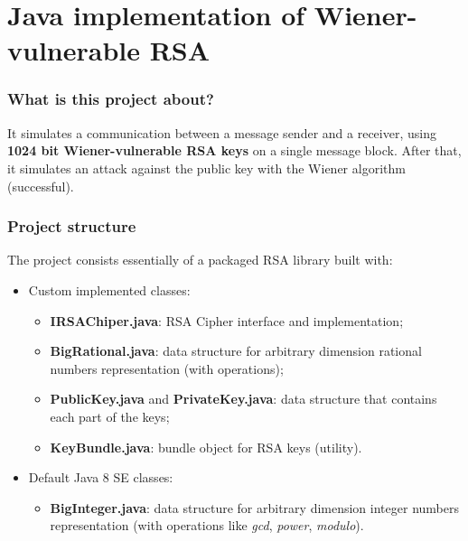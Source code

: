\documentclass{beamer}
\begin{document}
\section{Java implementation of Wiener-vulnerable RSA}

  \frame{\sectionpage}
  
  \begin{frame}
  \frametitle{What is this project about?}
    It simulates a communication between a message sender and a receiver, using \textbf{1024 bit Wiener-vulnerable RSA keys} on a single message block. After that, it simulates an attack against the public key with the Wiener algorithm (successful).
  \end{frame}
  
    \begin{frame}
    \frametitle{Project structure}
    
    The project consists essentially of a packaged RSA library built with:
    
    \begin{itemize}
    	\item Custom implemented classes:
    	\begin{itemize}
    		\item \textbf{IRSAChiper.java}: RSA Cipher interface and implementation;
    		\item \textbf{BigRational.java}: data structure for arbitrary dimension rational numbers representation (with operations);
    		\item \textbf{PublicKey.java} and \textbf{PrivateKey.java}: data structure that contains each part of the keys; 
    		\item \textbf{KeyBundle.java}: bundle object for RSA keys (utility).
    	\end{itemize}
    	\item Default Java 8 SE classes:
    		\begin{itemize}
    			\item \textbf{BigInteger.java}: data structure for arbitrary dimension integer numbers representation (with operations like \textit{gcd}, \textit{power}, \textit{modulo}).
    		\end{itemize}
    	\end{itemize}
    
    
    
    
  
  \end{frame}
  
\end{document}
